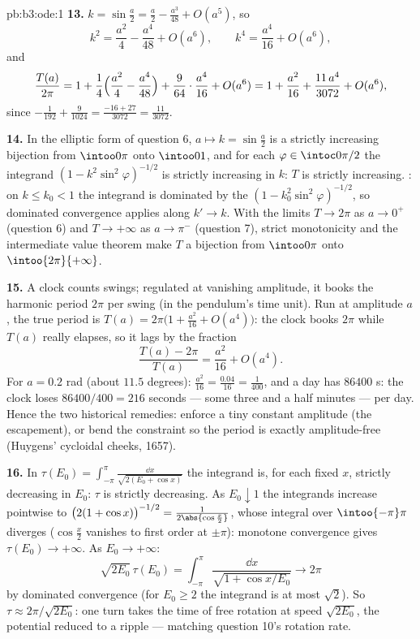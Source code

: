 \begin{solution}{pb:b3:ode:1}
\textbf{13.} $k = \sin\frac a2 = \frac a2 - \frac{a^3}{48} +
O(a^5)$, so
\[
k^2 = \frac{a^2}4 - \frac{a^4}{48} + O(a^6),
\qquad
k^4 = \frac{a^4}{16} + O(a^6) ,
\]
and
\[
\frac{T(a)}{2\pi} = 1 + \frac14\Bigl(\frac{a^2}4 -
\frac{a^4}{48}\Bigr) + \frac9{64}\cdot\frac{a^4}{16} +
O(a^6)
= 1 + \frac{a^2}{16} + \frac{11\,a^4}{3072} + O(a^6) ,
\]
since $-\frac1{192} + \frac9{1024} = \frac{-16 + 27}{3072}
= \frac{11}{3072}$.

\textbf{14.} In the elliptic form of question 6, $a \mapsto
k = \sin\frac a2$ is a  strictly increasing
bijection from $\intoo0\pi$ onto $\intoo01$, and for each
$\varphi \in \intoc0{\pi/2}$ the integrand $(1 -
k^2\sin^2\varphi)^{-1/2}$ is strictly increasing in $k$: $T$
is strictly increasing. : on $k \leq k_0 < 1$ the
integrand is dominated by the  $(1 -
k_0^2\sin^2\varphi)^{-1/2}$, so dominated convergence
applies along $k' \to k$. With the limits $T \to 2\pi$ as $a
\to 0^+$ (question 6) and $T \to +\infty$ as $a \to \pi^-$
(question 7), strict monotonicity and the intermediate value
theorem make $T$ a bijection from $\intoo0\pi$ onto
$\intoo{2\pi}{+\infty}$.

\textbf{15.} A clock counts swings; regulated at vanishing
amplitude, it books the harmonic period $2\pi$ per swing (in
the pendulum's time unit). Run at amplitude $a$, the true
period is $T(a) = 2\pi\bigl(1 + \frac{a^2}{16} +
O(a^4)\bigr)$: the clock books $2\pi$ while $T(a)$ really
elapses, so it lags by the fraction
\[
\frac{T(a) - 2\pi}{T(a)} = \frac{a^2}{16} + O(a^4) .
\]
For $a = 0.2$ rad (about $11.5$ degrees): $\frac{a^2}{16} =
\frac{0.04}{16} = \frac1{400}$, and a day has $86400$ s: the
clock loses $86400/400 = 216$ seconds --- some three and a
half minutes --- per day. Hence the two historical remedies:
enforce a tiny constant amplitude (the escapement), or bend
the constraint so the period is exactly amplitude-free
(Huygens' cycloidal cheeks, 1657).

\textbf{16.} In $\tau(E_0) = \int_{-\pi}^{\pi}\frac{\dd
x}{\sqrt{2(E_0 + \cos x)}}$ the integrand is, for each fixed
$x$, strictly decreasing in $E_0$: $\tau$ is strictly
decreasing. As $E_0 \downarrow 1$ the integrands increase
pointwise to $\bigl(2(1 + \cos x)\bigr)^{-1/2} =
\frac1{2\abs{\cos\frac x2}}$, whose integral over
$\intoo{-\pi}\pi$ diverges ($\cos\frac x2$ vanishes to first
order at $\pm\pi$): monotone convergence gives $\tau(E_0)
\to +\infty$. As $E_0 \to +\infty$:
\[
\sqrt{2E_0}\,\tau(E_0) = \int_{-\pi}^{\pi}
\frac{\dd x}{\sqrt{1 + \cos x/E_0}} \longrightarrow 2\pi
\]
by dominated convergence (for $E_0 \geq 2$ the integrand is
at most $\sqrt2$). So $\tau \approx 2\pi/\sqrt{2E_0}$: one
turn takes the time of free rotation at speed $\sqrt{2E_0}$,
the potential reduced to a ripple --- matching question
10's rotation rate.


\end{solution}
